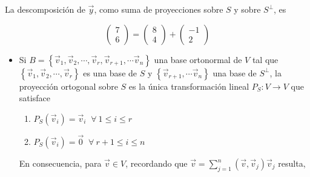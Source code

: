 {\begin{example}
\bigskip

 La descomposición de $\vec{y}$, como suma de proyecciones sobre $S$ y sobre  $S^{\perp}$, es

 

$$\left(\begin{array}{c}  7  \\ 6
\end{array}
 \right)=\left(\begin{array}{c}  8  \\ 4
\end{array}
 \right)+ \left(\begin{array}{c}  -1  \\ 2
\end{array}
 \right)$$
 
\end{example}

\bigskip

\begin{remark}
\begin{itemize}
    \item 
   Si $B=\left\{\vec{v}_1,\vec{v}_2,\cdots,\vec{v}_r,\vec{v}_{r+1}, \cdots\vec{v}_n\right\}$ una base ortonormal de $V$ tal que $\left\{\vec{v}_1,\vec{v}_2,\cdots,\vec{v}_r\right\}$ es una base de $S$ y $ \left\{\vec{v}_{r+1}, \cdots\vec{v}_n\right\}$ una base de $S^{\perp}$, la proyección ortogonal sobre $S$ es la única transformación lineal $P_S :  V \rightarrow V$ que satisface 

\bigskip

\begin{enumerate}

\item $P_S(\vec{v}_i)=\vec{v}_i $  $ ~ \forall ~ 1 \leq i \leq r$

\bigskip

\item $P_S(\vec{v}_i)=\vec{0} $  $ ~ \forall ~ r+1 \leq i \leq n$

\end{enumerate}

\bigskip

En consecuencia, para $\vec{v}\in V$, recordando que $ \vec{v} =\sum^{n}_{j=1}   (\vec{v}, \vec{v}_j)  \vec{v}_j $   resulta,




\end{itemize}
\end{remark}}
